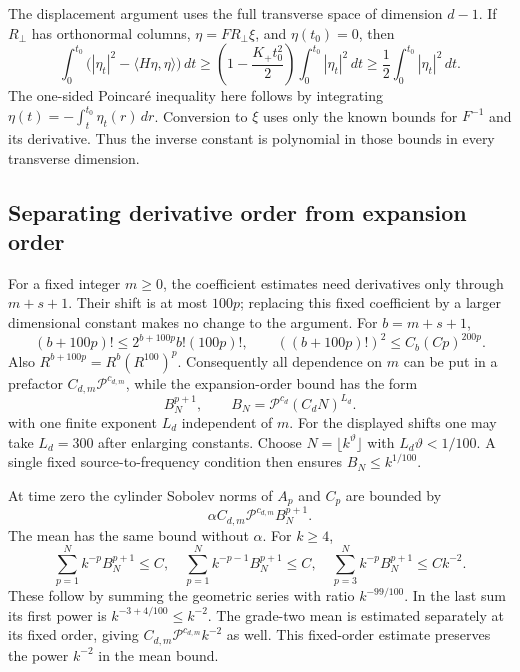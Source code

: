 \documentclass[11pt]{article}
\theoremstyle{definition}
\begin{document}
The displacement argument uses the full transverse space of dimension
$d-1$. If $R_\perp$ has orthonormal columns, $\eta=FR_\perp\xi$, and
$\eta(t_0)=0$, then
\[
 \int_0^{t_0}\bigl(|\eta_t|^2-\langle H\eta,\eta\rangle\bigr)\,dt
 \ge \left(1-\frac{K_+t_0^2}{2}\right)
                       \int_0^{t_0}|\eta_t|^2\,dt
 \ge\frac12\int_0^{t_0}|\eta_t|^2\,dt.
\]
The one-sided Poincar\'e inequality here follows by integrating
$\eta(t)=-\int_t^{t_0}\eta_t(r)\,dr$. Conversion to $\xi$ uses only the
known bounds for $F^{-1}$ and its derivative. Thus the inverse constant is
polynomial in those bounds in every transverse dimension.

\subsection{Separating derivative order from expansion order}
For a fixed integer $m\ge0$, the coefficient estimates need derivatives
only through $m+s+1$. Their shift is at most $100p$; replacing this fixed
coefficient by a larger dimensional constant makes no change to the
argument. For $b=m+s+1$,
\[
 (b+100p)!\le2^{b+100p}b!(100p)!,\qquad
 ((b+100p)!)^2\le C_b(Cp)^{200p}.
\]
Also $R^{b+100p}=R^b(R^{100})^p$. Consequently all dependence on $m$
can be put in a prefactor $C_{d,m}\mathcal P^{c_{d,m}}$, while the
expansion-order bound has the form
\begin{equation}
 B_N^{p+1},\qquad B_N=\mathcal P^{c_d}(C_dN)^{L_d}.
 \label{eq:initial-grade-base}
\end{equation}
with one finite exponent $L_d$ independent of $m$.
For the displayed shifts one may take $L_d=300$ after enlarging constants.
Choose $N=\lfloor k^\vartheta\rfloor$ with
$L_d\vartheta<1/100$. A single fixed source-to-frequency condition then
ensures $B_N\le k^{1/100}$.

At time zero the cylinder Sobolev norms of $A_p$ and $C_p$ are bounded by
\[ \alpha C_{d,m}\mathcal P^{c_{d,m}}B_N^{p+1}. \]
The mean has the same bound without $\alpha$. For $k\ge4$,
\[
 \sum_{p=1}^{N}k^{-p}B_N^{p+1}\le C,
 \quad
 \sum_{p=1}^{N}k^{-p-1}B_N^{p+1}\le C,
 \quad
 \sum_{p=3}^{N}k^{-p}B_N^{p+1}\le Ck^{-2}.
\]
These follow by summing the geometric series with ratio $k^{-99/100}$.
In the last sum its first power is $k^{-3+4/100}\le k^{-2}$.
The grade-two mean is estimated separately at its fixed order, giving
$C_{d,m}\mathcal P^{c_{d,m}}k^{-2}$ as well. This fixed-order estimate preserves
the power $k^{-2}$ in the mean bound.
\end{document}

